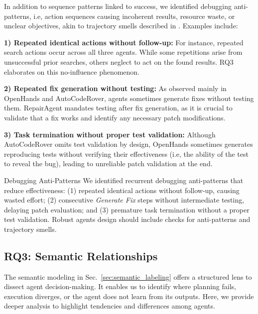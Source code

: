 \documentclass[conference,10pt]{IEEEtran}
\theoremstyle{definition}        %
\newcommand{\ra}{Repair\-Agent}
\newcommand{\oh}{Open\-Hands}
\newcommand{\acr}{Auto\-Code\-Rover}
\begin{document}
In addition to sequence patterns linked to success, we identified debugging anti-patterns, i.e, action sequences causing incoherent results, resource waste, or unclear objectives, akin to trajectory smells described in \cite{rondon2025evaluating}. Examples include:

\textbf{1) Repeated identical actions without follow-up:} For instance, repeated search actions occur across all three agents. While some repetitions arise from unsuccessful prior searches, others neglect to act on the found results. RQ3 elaborates on this no-influence phenomenon.

\textbf{2) Repeated fix generation without testing:} As observed mainly in \oh{} and \acr{}, agents sometimes generate fixes without testing them. \ra{} mandates testing after fix generation, as it is crucial to validate that a fix works and identify any necessary patch modifications.

\textbf{3) Task termination without proper test validation:} Although \acr{} omits test validation by design, \oh{} sometimes generates reproducing tests without verifying their effectiveness (i.e, the ability of the test to reveal the bug), leading to unreliable patch validation at the end.


\begin{findingsbox}{Debugging Anti-Patterns}
We identified recurrent debugging anti-patterns that reduce effectiveness: (1) repeated identical actions without follow-up, causing wasted effort; (2) consecutive \textit{Generate Fix} steps without intermediate testing, delaying patch evaluation; and (3) premature task termination without a proper test validation. Robust agents design should include checks for anti-patterns and trajectory smells.
\end{findingsbox}




\subsection{\textbf{RQ3}: Semantic Relationships}

The semantic modeling in Sec.~\ref{sec:semantic_labeling} offers a structured lens to dissect agent decision-making.
It enables us to identify where planning fails, execution diverges, or the agent does not learn from its outputs.
Here, we provide deeper analysis to highlight tendencies and differences among agents.
\end{document}
